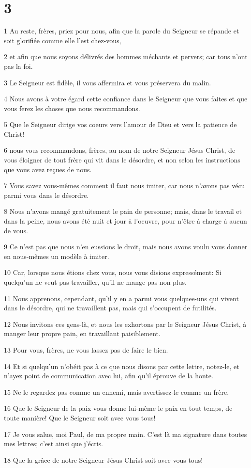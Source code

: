 \chapter{3}

\par 1 Au reste, frères, priez pour nous, afin que la parole du Seigneur se répande et soit glorifiée comme elle l'est chez-vous,
\par 2 et afin que nous soyons délivrés des hommes méchants et pervers; car tous n'ont pas la foi.
\par 3 Le Seigneur est fidèle, il vous affermira et vous préservera du malin.
\par 4 Nous avons à votre égard cette confiance dans le Seigneur que vous faites et que vous ferez les choses que nous recommandons.
\par 5 Que le Seigneur dirige vos coeurs vers l'amour de Dieu et vers la patience de Christ!
\par 6 nous vous recommandons, frères, au nom de notre Seigneur Jésus Christ, de vous éloigner de tout frère qui vit dans le désordre, et non selon les instructions que vous avez reçues de nous.
\par 7 Vous savez vous-mêmes comment il faut nous imiter, car nous n'avons pas vécu parmi vous dans le désordre.
\par 8 Nous n'avons mangé gratuitement le pain de personne; mais, dans le travail et dans la peine, nous avons été nuit et jour à l'oeuvre, pour n'être à charge à aucun de vous.
\par 9 Ce n'est pas que nous n'en eussions le droit, mais nous avons voulu vous donner en nous-mêmes un modèle à imiter.
\par 10 Car, lorsque nous étions chez vous, nous vous disions expressément: Si quelqu'un ne veut pas travailler, qu'il ne mange pas non plus.
\par 11 Nous apprenons, cependant, qu'il y en a parmi vous quelques-uns qui vivent dans le désordre, qui ne travaillent pas, mais qui s'occupent de futilités.
\par 12 Nous invitons ces gens-là, et nous les exhortons par le Seigneur Jésus Christ, à manger leur propre pain, en travaillant paisiblement.
\par 13 Pour vous, frères, ne vous lassez pas de faire le bien.
\par 14 Et si quelqu'un n'obéit pas à ce que nous disons par cette lettre, notez-le, et n'ayez point de communication avec lui, afin qu'il éprouve de la honte.
\par 15 Ne le regardez pas comme un ennemi, mais avertissez-le comme un frère.
\par 16 Que le Seigneur de la paix vous donne lui-même le paix en tout temps, de toute manière! Que le Seigneur soit avec vous tous!
\par 17 Je vous salue, moi Paul, de ma propre main. C'est là ma signature dans toutes mes lettres; c'est ainsi que j'écris.
\par 18 Que la grâce de notre Seigneur Jésus Christ soit avec vous tous!


